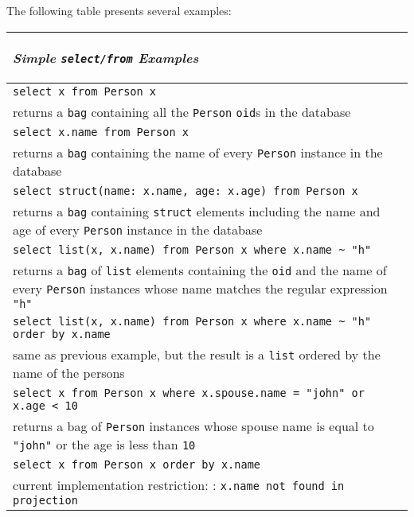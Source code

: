 \ee
The following table presents several examples:
\newcommand{\exselect}[2]{\begin{tabular}{|p{11cm}|}
\hline \texttt{#1}\\
\hline #2\\
\hline
\end{tabular}
\bettabx
}
\renewcommand{\exselect}[2]{
\hline \hline \texttt{#1}\\#2\\
}
\renewcommand{\exselect}[2]{
\hline\texttt{#1}\\#2\\
}
\begin{longtable}[l]{|p{12cm}|}
\hline \begin{center}\emph{Simple \texttt{select/from} Examples}\end{center}\\
\exselect{select x from Person x}{returns a \texttt{bag} containing
all the \texttt{Person} \texttt{oid}s in the database}
\exselect{select x.name from Person x}{returns a \texttt{bag}
containing the name of every \texttt{Person} instance in the database}
\exselect{select struct(name: x.name, age: x.age) from Person x}{
returns a \texttt{bag}
containing \texttt{struct} elements including the name and age of every \texttt{Person} instance in the database}
\exselect{select list(x, x.name) from Person x where x.name \~{} "h"}{returns a \texttt{bag} of \texttt{list} elements
containing the \texttt{oid} and the name of every \texttt{Person} instances 
whose name matches the regular expression \texttt{"h"}}
\exselect{select list(x, x.name) from Person x where x.name \~{} "h" order by x.name}{same as previous example, but the result is a \texttt{list} ordered
by the name of the persons}
\exselect{select x from Person x where x.spouse.name = "john" or x.age < 10}{returns
a bag of \texttt{Person} instances whose spouse name is equal to \texttt{"john"} or
the age is less than \texttt{10}}
\exselect{select x from Person x order by x.name}{current implementation restriction: \rerr: \texttt{x.name not found in projection}}
\hline
\end{longtable}

